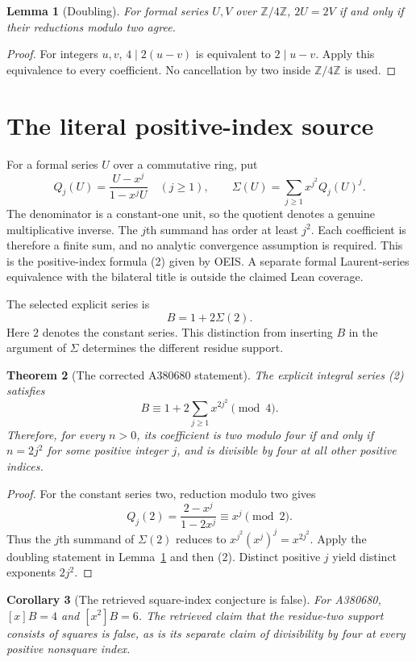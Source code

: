 \documentclass[11pt,a4paper]{article}
\newtheorem{theorem}{Theorem}[section]
\newtheorem{lemma}[theorem]{Lemma}
\newtheorem{corollary}[theorem]{Corollary}
\theoremstyle{remark}
\newcommand{\Z}{\mathbb Z}
\begin{document}
\begin{lemma}[Doubling]\label{lem:binary}
For formal series $U,V$ over $\Z/4\Z$, $2U=2V$ if and only if their
reductions modulo two agree.
\end{lemma}
\begin{proof}
For integers $u,v$, $4\mid2(u-v)$ is equivalent to $2\mid u-v$. Apply
this equivalence to every coefficient. No cancellation by two inside
$\Z/4\Z$ is used.
\end{proof}

\section{The literal positive-index source}

For a formal series $U$ over a commutative ring, put
\[
 Q_j(U)=\frac{U-x^j}{1-x^jU}\quad(j\ge1),\qquad
 \Sigma(U)=\sum_{j\ge1}x^{j^2}Q_j(U)^j. \tag{1}
\]
The denominator is a constant-one unit, so the quotient denotes a genuine
multiplicative inverse. The $j$th summand has order at least $j^2$.
Each coefficient is therefore a finite sum, and no analytic convergence
assumption is required. This is the positive-index formula (2) given by OEIS.
A separate formal Laurent-series equivalence with the bilateral title is
outside the claimed Lean coverage.

The selected explicit series is
\[
 B=1+2\Sigma(2). \tag{2}
\]
Here $2$ denotes the constant series. This distinction from inserting
$B$ in the argument of $\Sigma$ determines the different residue support.
\begin{theorem}[The corrected A380680 statement]\label{thm:theta680}
The explicit integral series (2) satisfies
\[
 B\equiv1+2\sum_{j\ge1}x^{2j^2}\pmod4.
\]
Therefore, for every $n>0$, its coefficient is two modulo four if and
only if $n=2j^2$ for some positive integer $j$, and is divisible by four
at all other positive indices.
\end{theorem}

\begin{proof}
For the constant series two, reduction modulo two gives
\[
 Q_j(2)=\frac{2-x^j}{1-2x^j}\equiv x^j\pmod2.
\]
Thus the $j$th summand of $\Sigma(2)$ reduces to
$x^{j^2}(x^j)^j=x^{2j^2}$. Apply the doubling statement in
Lemma~\ref{lem:binary} and then (2). Distinct positive $j$ yield distinct
exponents $2j^2$.
\end{proof}

\begin{corollary}[The retrieved square-index conjecture is false]
For A380680, $[x]B=4$ and $[x^2]B=6$. The retrieved claim that the
residue-two support consists of squares is false, as is its separate
claim of divisibility by four at every positive nonsquare index.
\end{corollary}
\end{document}
